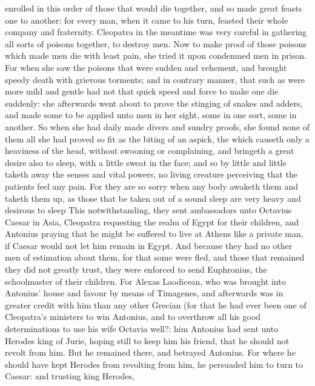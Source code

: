 \documentclass{book}
\begin{document}
enrolled in this order of those that would die together, and so made
great feasts one to another: for every man, when it came to his turn,
feasted their whole company and fraternity.
Cleopatra 
in the meantime was very careful in gathering all sorts of poisons
together, to destroy men. Now to make proof of those poisons which
made men die with least pain, she tried it upon condemned men in
prison. For when she saw the poisons that were sudden and vehement,
and brought speedy death with grievous torments; and in contrary
manner, that such as were more mild and gentle had not that quick
speed and force to make one die suddenly: she afterwards went about to
prove the stinging of snakes and adders, and made some to be applied
unto men in her sight, some in one sort, some in another. So
 when she had daily made
divers and sundry proofs, she found none of them all she had proved so
fit as the biting of an aspick, the which causeth only a heaviness of
the head, without swooning or complaining, and bringeth a great desire
also to sleep, with a little sweat in the face; and so by little and
little taketh away the senses and vital powers, no living creature
perceiving that the patients feel any pain. For they are so sorry when
any body awaketh them and taketh them up, as those that be taken out
of a sound sleep are very heavy and desirous to sleep
This notwithstanding, they sent ambassadors unto Octavius Caesar
in Asia, Cleopatra requesting the realm of Egypt for their children,
and Antonius 
praying that he might be suffered to live at Athens
like a private man, if Caesar would not let him remain in Egypt. And
because they had no other men of estimation about them, for that
some were fled, and those that remained they did not greatly trust,
they were enforced to send Euphronius, the schoolmaster of their
children. For Alexas Laodicean, who was brought into Antonius' house
and favour by means of Timagenes, and afterwards was in greater credit
with him than any other Grecian (for that he had ever been one of
Cleopatra's ministers to win Antonius, and to overthrow all his good
determinations to use his wife Octavia well?: him Antonius had sent
unto Herodes king of Jurie, hoping still to keep him his friend, that
he should not revolt from him. But he remained there, and betrayed
Antonius. For where he should have kept Herodes from revolting from
him, he persuaded him to turn to Caesar: and trusting king Herodes,
\end{document}
